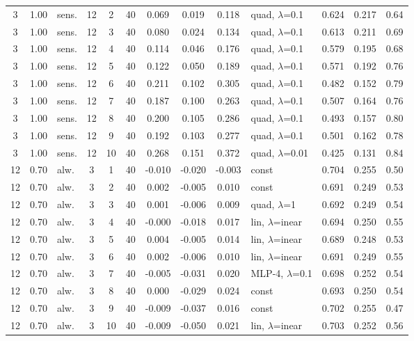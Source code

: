 \begin{scriptsize}
\begin{longtable}{cclcc c ccc l ccc}
3 & 1.00 & sens. & 12 & 2 & 40 & 0.069 & 0.019 & 0.118 & quad, $\lambda$=0.1 & 0.624 & 0.217 & 0.64 \\
3 & 1.00 & sens. & 12 & 3 & 40 & 0.080 & 0.024 & 0.134 & quad, $\lambda$=0.1 & 0.613 & 0.211 & 0.69 \\
3 & 1.00 & sens. & 12 & 4 & 40 & 0.114 & 0.046 & 0.176 & quad, $\lambda$=0.1 & 0.579 & 0.195 & 0.68 \\
3 & 1.00 & sens. & 12 & 5 & 40 & 0.122 & 0.050 & 0.189 & quad, $\lambda$=0.1 & 0.571 & 0.192 & 0.76 \\
3 & 1.00 & sens. & 12 & 6 & 40 & 0.211 & 0.102 & 0.305 & quad, $\lambda$=0.1 & 0.482 & 0.152 & 0.79 \\
3 & 1.00 & sens. & 12 & 7 & 40 & 0.187 & 0.100 & 0.263 & quad, $\lambda$=0.1 & 0.507 & 0.164 & 0.76 \\
3 & 1.00 & sens. & 12 & 8 & 40 & 0.200 & 0.105 & 0.286 & quad, $\lambda$=0.1 & 0.493 & 0.157 & 0.80 \\
3 & 1.00 & sens. & 12 & 9 & 40 & 0.192 & 0.103 & 0.277 & quad, $\lambda$=0.1 & 0.501 & 0.162 & 0.78 \\
3 & 1.00 & sens. & 12 & 10 & 40 & 0.268 & 0.151 & 0.372 & quad, $\lambda$=0.01 & 0.425 & 0.131 & 0.84 \\
12 & 0.70 & alw. & 3 & 1 & 40 & -0.010 & -0.020 & -0.003 & const & 0.704 & 0.255 & 0.50 \\
12 & 0.70 & alw. & 3 & 2 & 40 & 0.002 & -0.005 & 0.010 & const & 0.691 & 0.249 & 0.53 \\
12 & 0.70 & alw. & 3 & 3 & 40 & 0.001 & -0.006 & 0.009 & quad, $\lambda$=1 & 0.692 & 0.249 & 0.54 \\
12 & 0.70 & alw. & 3 & 4 & 40 & -0.000 & -0.018 & 0.017 & lin, $\lambda$=inear & 0.694 & 0.250 & 0.55 \\
12 & 0.70 & alw. & 3 & 5 & 40 & 0.004 & -0.005 & 0.014 & lin, $\lambda$=inear & 0.689 & 0.248 & 0.53 \\
12 & 0.70 & alw. & 3 & 6 & 40 & 0.002 & -0.006 & 0.010 & lin, $\lambda$=inear & 0.691 & 0.249 & 0.55 \\
12 & 0.70 & alw. & 3 & 7 & 40 & -0.005 & -0.031 & 0.020 & MLP-4, $\lambda$=0.1 & 0.698 & 0.252 & 0.54 \\
12 & 0.70 & alw. & 3 & 8 & 40 & 0.000 & -0.029 & 0.024 & const & 0.693 & 0.250 & 0.54 \\
12 & 0.70 & alw. & 3 & 9 & 40 & -0.009 & -0.037 & 0.016 & const & 0.702 & 0.255 & 0.47 \\
12 & 0.70 & alw. & 3 & 10 & 40 & -0.009 & -0.050 & 0.021 & lin, $\lambda$=inear & 0.703 & 0.252 & 0.56 \\

\end{longtable}
\end{scriptsize}
